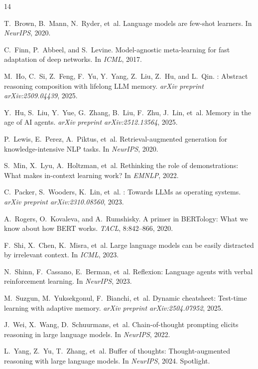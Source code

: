 \documentclass[11pt]{article}
\begin{document}
\begin{thebibliography}{14}

T.~Brown, B.~Mann, N.~Ryder, et~al.
\newblock Language models are few-shot learners.
\newblock In \emph{NeurIPS}, 2020.

C.~Finn, P.~Abbeel, and S.~Levine.
\newblock Model-agnostic meta-learning for fast adaptation of deep networks.
\newblock In \emph{ICML}, 2017.

M.~Ho, C.~Si, Z.~Feng, F.~Yu, Y.~Yang, Z.~Liu, Z.~Hu, and L.~Qin.
: Abstract reasoning composition with lifelong {LLM} memory.
\newblock \emph{arXiv preprint arXiv:2509.04439}, 2025.

Y.~Hu, S.~Liu, Y.~Yue, G.~Zhang, B.~Liu, F.~Zhu, J.~Lin, et~al.
\newblock Memory in the age of {AI} agents.
\newblock \emph{arXiv preprint arXiv:2512.13564}, 2025.

P.~Lewis, E.~Perez, A.~Piktus, et~al.
\newblock Retrieval-augmented generation for knowledge-intensive {NLP} tasks.
\newblock In \emph{NeurIPS}, 2020.

S.~Min, X.~Lyu, A.~Holtzman, et~al.
\newblock Rethinking the role of demonstrations: What makes in-context learning work?
\newblock In \emph{EMNLP}, 2022.

C.~Packer, S.~Wooders, K.~Lin, et~al.
: Towards {LLMs} as operating systems.
\newblock \emph{arXiv preprint arXiv:2310.08560}, 2023.

A.~Rogers, O.~Kovaleva, and A.~Rumshisky.
\newblock A primer in {BERTology}: What we know about how {BERT} works.
\newblock \emph{TACL}, 8:842--866, 2020.

F.~Shi, X.~Chen, K.~Misra, et~al.
\newblock Large language models can be easily distracted by irrelevant context.
\newblock In \emph{ICML}, 2023.

N.~Shinn, F.~Cassano, E.~Berman, et~al.
\newblock Reflexion: Language agents with verbal reinforcement learning.
\newblock In \emph{NeurIPS}, 2023.

M.~Suzgun, M.~Yuksekgonul, F.~Bianchi, et~al.
\newblock Dynamic cheatsheet: Test-time learning with adaptive memory.
\newblock \emph{arXiv preprint arXiv:2504.07952}, 2025.

J.~Wei, X.~Wang, D.~Schuurmans, et~al.
\newblock Chain-of-thought prompting elicits reasoning in large language models.
\newblock In \emph{NeurIPS}, 2022.

L.~Yang, Z.~Yu, T.~Zhang, et~al.
\newblock Buffer of thoughts: Thought-augmented reasoning with large language models.
\newblock In \emph{NeurIPS}, 2024. Spotlight.

\end{thebibliography}
\end{document}
